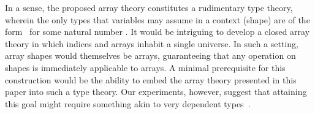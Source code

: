 In a sense, the proposed array theory constitutes a rudimentary type theory,
wherein the only types that variables may assume in a context (shape) are of
the form \, for some natural number .  It would be
intriguing to develop a closed array theory in which indices and arrays inhabit
a single universe.  In such a setting, array shapes would themselves be arrays,
guaranteeing that any operation on shapes is immediately applicable to arrays.
A minimal prerequisite for this construction would be the ability to embed the
array theory presented in this paper into such a type theory.
Our experiments, however, suggest that
attaining this goal might require something akin to very dependent
types~\citep{altenkirch_et_al:LIPIcs.TYPES.2022.10}.
